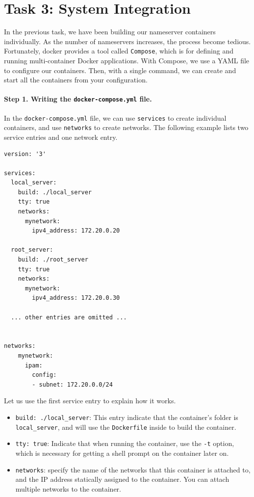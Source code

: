 \section{Task 3: System Integration}

In the previous task, we have been building our nameserver containers 
individually. As the number of 
nameservers increases, the process become tedious. Fortunately,
docker provides a tool called \texttt{Compose}, which 
is for defining and running multi-container Docker applications. 
With Compose, we use a YAML file to configure our containers. Then, with a single command, 
we can create and start all the containers from your configuration.

\paragraph{Step 1. Writing the \texttt{docker-compose.yml} file.}
In the \texttt{docker-compose.yml} file, we can use \texttt{services} to 
create individual containers, and use \texttt{networks} to 
create networks. The following example lists two 
service entries and one network entry. 

\begin{lstlisting}[caption={\texttt{docker-compose.yml}}]
version: '3'

services:
  local_server:                  
    build: ./local_server
    tty: true
    networks:
      mynetwork:
        ipv4_address: 172.20.0.20

  root_server:
    build: ./root_server
    tty: true
    networks:
      mynetwork:
        ipv4_address: 172.20.0.30

  ... other entries are omitted ...
   

networks:
    mynetwork:
      ipam:
        config:
        - subnet: 172.20.0.0/24
\end{lstlisting}

Let us use the first service entry to explain how it works. 

\begin{itemize}
\item \texttt{build: ./local\_server}: This entry indicate that the container's folder 
is \texttt{local\_server}, and will use the \texttt{Dockerfile} inside to build the container.

\item \texttt{tty: true}: Indicate that when running the container, use the 
\texttt{-t} option, which is necessary for getting a shell prompt 
on the container later on. 

\item \texttt{networks}: specify the name of the networks that this container is attached to,
and the IP address statically assigned to the container. You can attach multiple networks
to the container. 
\end{itemize}
 

